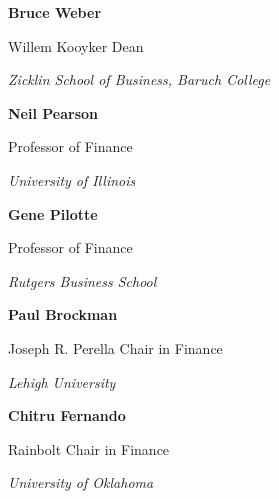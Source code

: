 \documentclass[11pt,a4paper,]{awesome-cv}
\let\oldtextbf\textbf
\renewcommand{\textbf}[1]{\oldtextbf{#1}\vspace{-1mm}}
\begin{document}
\textbf{Bruce Weber}

Willem Kooyker Dean

\textit{Zicklin School of Business, Baruch College}

\textbf{Neil Pearson}

Professor of Finance

\textit{University of Illinois}

\textbf{Gene Pilotte}

Professor of Finance

\textit{Rutgers Business School}

\textbf{Paul Brockman}

Joseph R. Perella Chair in Finance

\textit{Lehigh University}

\textbf{Chitru Fernando}

Rainbolt Chair in Finance

\textit{University of Oklahoma}
\end{document}
